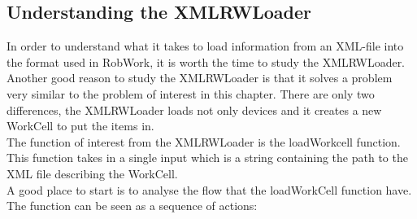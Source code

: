 \subsection{Understanding the XMLRWLoader}
In order to understand what it takes to load information from an XML-file into the format used in RobWork, it is worth the time to study the XMLRWLoader. Another good reason to study the XMLRWLoader is that it solves a problem very similar to the problem of interest in this chapter. There are only two differences, the XMLRWLoader loads not only devices and it creates a new WorkCell to put the items in.\\

The function of interest from the XMLRWLoader is the loadWorkcell function. This function takes in a single input which is a string containing the path to the XML file describing the WorkCell.\\
A good place to start is to analyse the flow that the loadWorkCell function have. The function can be seen as a sequence of actions:

